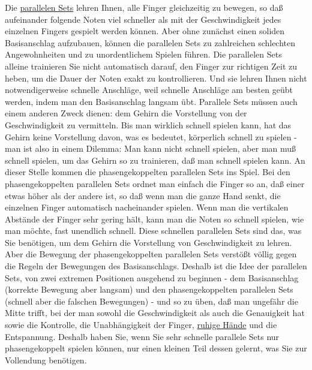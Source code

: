 Die \hyperref[c1ii11]{parallelen Sets} lehren Ihnen, alle Finger gleichzeitig zu bewegen, so daß aufeinander folgende Noten viel schneller als mit der Geschwindigkeit jedes einzelnen Fingers gespielt werden können.
Aber ohne zunächst einen soliden Basisanschlag aufzubauen, können die parallelen Sets zu zahlreichen schlechten Angewohnheiten und zu unordentlichem Spielen führen.
Die parallelen Sets alleine trainieren Sie nicht automatisch darauf, den Finger zur richtigen Zeit zu heben, um die Dauer der Noten exakt zu kontrollieren.
Und sie lehren Ihnen nicht notwendigerweise schnelle Anschläge, weil schnelle Anschläge am besten geübt werden, indem man den Basisanschlag langsam übt.
Parallele Sets müssen auch einem anderen Zweck dienen: dem Gehirn die Vorstellung von der Geschwindigkeit zu vermitteln.
Bis man wirklich schnell spielen kann, hat das Gehirn keine Vorstellung davon, was es bedeutet, körperlich schnell zu spielen - man ist also in einem Dilemma: Man kann nicht schnell spielen, aber man muß schnell spielen, um das Gehirn so zu trainieren, daß man schnell spielen kann.
An dieser Stelle kommen die phasengekoppelten parallelen Sets ins Spiel.
Bei den phasengekoppelten parallelen Sets ordnet man einfach die Finger so an, daß einer etwas höher als der andere ist, so daß wenn man die ganze Hand senkt, die einzelnen Finger automatisch nacheinander spielen.
Wenn man die vertikalen Abstände der Finger sehr gering hält, kann man die Noten so schnell spielen, wie man möchte, fast unendlich schnell.
Diese schnellen parallelen Sets sind das, was Sie benötigen, um dem Gehirn die Vorstellung von Geschwindigkeit zu lehren.
Aber die Bewegung der phasengekoppelten parallelen Sets verstößt völlig gegen die Regeln der Bewegungen des Basisanschlags.
Deshalb ist die Idee der parallelen Sets, von zwei extremen Positionen ausgehend zu beginnen - dem Basisanschlag (korrekte Bewegung aber langsam) und den phasengekoppelten parallelen Sets (schnell aber die falschen Bewegungen) - und so zu üben, daß man ungefähr die Mitte trifft, bei der man sowohl die Geschwindigkeit als auch die Genauigkeit hat sowie die Kontrolle, die Unabhängigkeit der Finger, \hyperref[ruhig]{ruhige Hände} und die Entspannung.
Deshalb haben Sie, wenn Sie sehr schnelle parallele Sets nur phasengekoppelt spielen können, nur einen kleinen Teil dessen gelernt, was Sie zur Vollendung benötigen.

